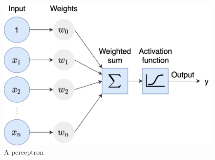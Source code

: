 \begin{figure}
    \centering
    \includegraphics[width=0.7 \linewidth]{images/perceptron.png}
    \caption{A perceptron}
    \label{fig:perceptron}
\end{figure}


